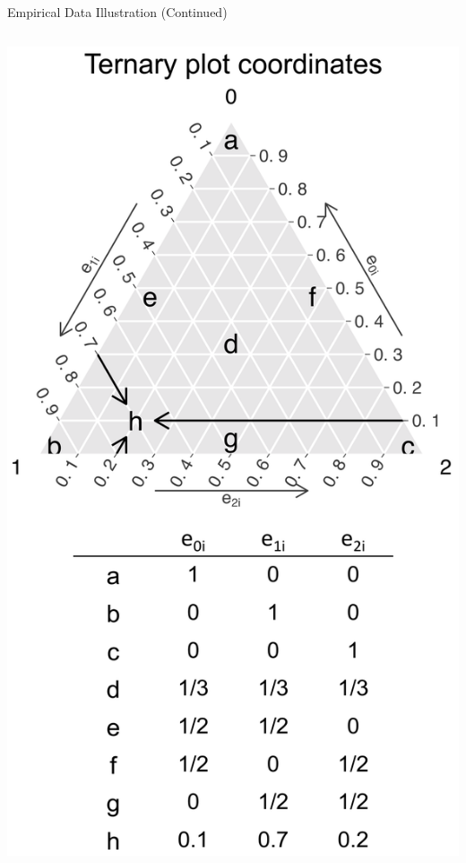\documentclass[final]{beamer}
\begin{document}
\begin{frame}[label={sec:org6cddcf1}]{}
\begin{columns}
\begin{column}[t]{0.48\columnwidth}
\begin{block}{Empirical Data Illustration (Continued)}
\begin{exampleblock}{}
\begin{columns}
\begin{column}{0.30\columnwidth}
\begin{center}
\includegraphics[page=1,keepaspectratio,width=1.0\textwidth]{../lib/ternary_coordinate_and_table_trimmed.png}
\end{center}
\end{column}
\end{columns}
\end{exampleblock}


\end{block}
\end{column}
\end{columns}
\end{frame}
\end{document}
